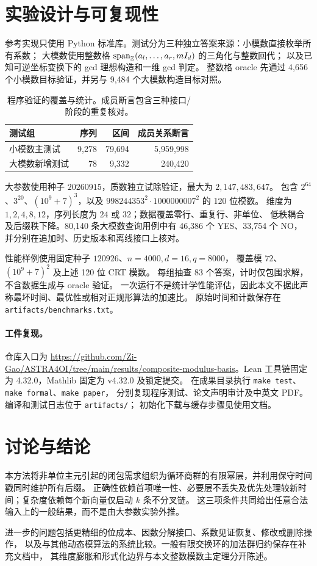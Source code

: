 \documentclass[11pt,a4paper,fontset=fandol]{ctexart}
\theoremstyle{definition}
\theoremstyle{plain}
\begin{document}
\section{实验设计与可复现性}
参考实现只使用 Python 标准库。测试分为三种独立答案来源：小模数直接枚举所有系数；
大模数使用整数格 $\operatorname{span}_\mathbb Z(a_l,\ldots,a_r,mI_d)$ 的三角化与整数回代；
以及已知可逆坐标变换下的 gcd 理想构造和一维 gcd 判定。
整数格 oracle 先通过 4,656 个小模数目标验证，并另与 9,484 个大模数构造目标对照。

\begin{table}[htbp]
\centering
\caption{程序验证的覆盖与统计。成员断言包含三种接口/阶段的重复核对。}\label{tab:tests}
\begin{tabular}{lrrr}
\toprule
测试组 & 序列 & 区间 & 成员关系断言\\
\midrule
小模数主测试 & 9,278 & 79,694 & 5,959,998\\
大模数新增测试 & 78 & 9,332 & 240,420\\
\bottomrule
\end{tabular}
\end{table}

大参数使用种子 $20260915$，质数独立试除验证，最大为 $2,147,483,647$。
包含 $2^{64}$、$3^{20}$、$(10^9+7)^3$，以及
$998244353^2\cdot1000000007^2$ 的 120 位模数。
维度为 $1,2,4,8,12$，序列长度为 $24$ 或 $32$；数据覆盖零行、重复行、非单位、
低秩耦合及后缀秩下降。80,140 条大模数查询用例中有 46,386 个 YES、33,754 个 NO，
并分别在追加时、历史版本和离线接口上核对。

性能样例使用固定种子 $120926$、$n=4000,d=16,q=8000$，
覆盖模 $72$、$(10^9+7)^2$ 及上述 120 位 CRT 模数。
每组抽查 83 个答案，计时仅包围求解，不含数据生成与 oracle 验证。
一次运行不是统计学性能评估，因此本文不据此声称最坏时间、最优性或相对正规形算法的加速比。
原始时间和计数保存在 \texttt{artifacts/benchmarks.txt}。

\paragraph{工件复现。}
仓库入口为 \url{https://github.com/Zi-Gao/ASTRA4OI/tree/main/results/composite-modulus-basis}。Lean 工具链固定为 4.32.0，Mathlib 固定为 v4.32.0 及锁定提交。
在成果目录执行 \texttt{make test}、\texttt{make formal}、\texttt{make paper}，
分别复现程序测试、论文声明审计及中英文 PDF。编译和测试日志位于 \texttt{artifacts/}；
初始化下载与缓存步骤见使用文档。

\section{讨论与结论}
本方法将非单位主元引起的闭包需求组织为循环商群的有限幂层，并利用保守时间戳同时维护所有后缀。
正确性依赖首项唯一性、必要层不丢失及优先处理较新时间；复杂度依赖每个新向量仅启动 $k$ 条不分叉链。
这三项条件共同给出任意合法输入上的一般结果，而不是由大参数实验外推。

进一步的问题包括更精细的位成本、因数分解接口、系数见证恢复、修改或删除操作，
以及与其他动态模算法的系统比较。一般有限交换环的加法群归约保存在补充文档中，
其维度膨胀和形式化边界与本文整数模数主定理分开陈述。
{\small


}
\end{document}
